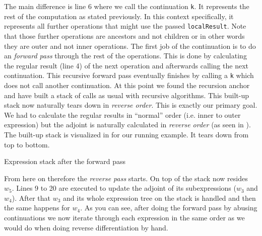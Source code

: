 The main difference is line 6 where we call the continuation \lstinline{k}. It represents the rest of the computation as stated previously. In this context specifically, it represents all further operations that might use the passed \lstinline{localResult}. Note that those further operations are ancestors and not children or in other words they are outer and not inner operations. The first job of the continuation is to do an \emph{forward pass} through the rest of the operations. This is done by calculating the regular result (line 4) of the next operation and afterwards calling the next continuation. This recursive forward pass eventually finishes by calling a \lstinline{k} which does not call another continuation. At this point we found the recursion anchor and have built a stack of calls as usual with recursive algorithms. This built-up stack now naturally tears down in \emph{reverse order}. This is exactly our primary goal. We had to calculate the regular results in ``normal'' order (i.e. inner to outer expression) but the adjoint is naturally calculated in \emph{reverse order} (as seen in ). The built-up stack is visualized in  for our running example. It tears down from top to bottom. 
\begin{center}


    \captionsetup{type=figure}
    \caption{Expression stack after the forward pass}
    \label{fig:stack}
\end{center}
From here on therefore the \emph{reverse pass} starts. On top of the stack now resides $w_5$. Lines 9 to 20 are executed to update the adjoint of its subexpressions ($w_3$ and $w_4$). After that $w_3$ and its whole expression tree on the stack is handled and then the same happens for $w_4$. As you can see, after doing the forward pass by abusing continuations we now iterate through each expression in the same order as we would do when doing reverse differentiation by hand.


